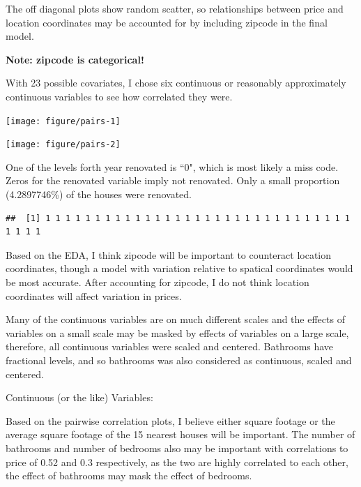 \documentclass{article}\usepackage[]{graphicx}\usepackage[]{color}
\makeatletter
\newenvironment{kframe}{%
 \def\at@end@of@kframe{}%
 \ifinner\ifhmode%
  \def\at@end@of@kframe{\end{minipage}}%
  \begin{minipage}{\columnwidth}%
 \fi\fi%
 \def\FrameCommand##1{\hskip\@totalleftmargin \hskip-\fboxsep
 \colorbox{shadecolor}{##1}\hskip-\fboxsep
     \hskip-\linewidth \hskip-\@totalleftmargin \hskip\columnwidth}%
 \MakeFramed {\advance\hsize-\width
   \@totalleftmargin\z@ \linewidth\hsize
   \@setminipage}}%
 {\par\unskip\endMakeFramed%
 \at@end@of@kframe}
\newenvironment{knitrout}{}{} %
\makeatother
\begin{document}
\begin{enumerate}
\begin{enumerate}
\begin{knitrout}
\end{knitrout}

The off diagonal plots show random scatter, so relationships between price and location coordinates may be accounted for by including zipcode in the final model.

{\bf Note: zipcode is categorical!}

With 23 possible covariates, I chose six continuous or reasonably approximately continuous variables to see how correlated they were.



\begin{knitrout}
\color{fgcolor}
\texttt{[image: figure/pairs-1]} 

\texttt{[image: figure/pairs-2]} 

\end{knitrout}

One of the levels forth year renovated is ``0", which is most likely a miss code. Zeros for the renovated variable imply not renovated. Only a small proportion (4.2897746\%) of the houses were renovated.

\begin{knitrout}
\color{fgcolor}\begin{kframe}
\begin{verbatim}
##  [1] 1 1 1 1 1 1 1 1 1 1 1 1 1 1 1 1 1 1 1 1 1 1 1 1 1 1 1 1 1 1 1 1 1 1 1
\end{verbatim}
\end{kframe}
\end{knitrout}

Based on the EDA, I think zipcode will be important to counteract location coordinates, though a model with variation relative to spatical coordinates would be most accurate. After accounting for zipcode, I do not think location coordinates will affect variation in prices.

Many of the continuous variables are on much different scales and the effects of variables on a small scale may be masked by effects of variables on a large scale, therefore, all continuous variables were scaled and centered. Bathrooms have fractional levels, and so bathrooms was also considered as continuous, scaled and centered.

Continuous (or the like) Variables:

Based on the pairwise correlation plots, I believe either square footage or the average square footage of the 15 nearest houses will be important. The number of bathrooms and number of bedrooms also may be important with correlations to price of 0.52 and 0.3 respectively, as the two are highly correlated to each other, the effect of bathrooms may mask the effect of bedrooms.


\end{enumerate}
\end{enumerate}
\end{document}
